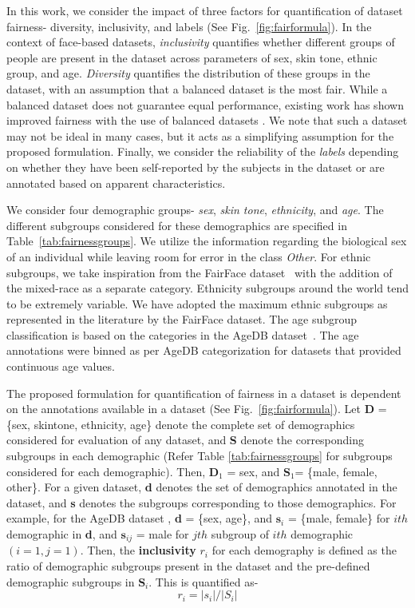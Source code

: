 \documentclass[journal]{IEEEtran}
\begin{document}
In this work, we consider the impact of three factors for quantification of dataset fairness- diversity, inclusivity, and labels (See Fig.~\ref{fig:fairformula}). In the context of face-based datasets, \textit{inclusivity} quantifies whether different groups of people are present in the dataset across parameters of sex, skin tone, ethnic group, and age. \textit{Diversity} quantifies the distribution of these groups in the dataset, with an assumption that a balanced dataset is the most fair. While a balanced dataset does not guarantee equal performance, existing work has shown improved fairness with the use of balanced datasets \cite{wang2021meta, ramaswamy2020fair}. We note that such a dataset may not be ideal in many cases, but it acts as a simplifying assumption for the proposed formulation. Finally, we consider the reliability of the \textit{labels} depending on whether they have been self-reported by the subjects in the dataset or are annotated based on apparent characteristics. 

We consider four demographic groups- \textit{sex}, \textit{skin tone}, \textit{ethnicity}, and \textit{age}. The different subgroups considered for these demographics are specified in Table~\ref{tab:fairnessgroups}. We utilize the information regarding the biological sex of an individual while leaving room for error in the class \textit{Other}. For ethnic subgroups, we take inspiration from the FairFace dataset~\cite{karkkainen2021fairface} with the addition of the mixed-race as a separate category. Ethnicity subgroups around the world tend to be extremely variable. We have adopted the maximum ethnic subgroups as represented in the literature by the FairFace dataset. The age subgroup classification is based on the categories in the AgeDB dataset~\cite{moschoglou2017agedb}. The age annotations were binned as per AgeDB categorization for datasets that provided continuous age values.

The proposed formulation for quantification of fairness in a dataset is dependent on the annotations available in a dataset (See Fig.~\ref{fig:fairformula}). Let \textbf{D} = \{sex, skintone, ethnicity, age\} denote the complete set of demographics considered for evaluation of any dataset, and \textbf{S} denote the corresponding subgroups in each demographic (Refer Table \ref{tab:fairnessgroups} for subgroups considered for each demographic). Then, $\textbf{D}_1$ = sex, and $\textbf{S}_1$= \{male, female, other\}. For a given dataset, \textbf{d} denotes the set of demographics annotated in the dataset, and \textbf{s} denotes the subgroups corresponding to those demographics. For example, for the AgeDB dataset \cite{moschoglou2017agedb}, \textbf{d} = \{sex, age\}, and $\textbf{s}_i$ = \{male, female\} for $ith$ demographic in \textbf{d}, and  $\textbf{s}_{ij}$ = male for $jth$ subgroup of $ith$ demographic $(i=1, j=1)$. Then, the \textbf{inclusivity} $r_i$ for each demography is defined as the ratio of demographic subgroups present in the dataset and the pre-defined demographic subgroups in $\textbf{S}_i$. This is quantified as-
\begin{equation}
     r_i = 	|s_i|/|S_i|
\end{equation}
\end{document}
